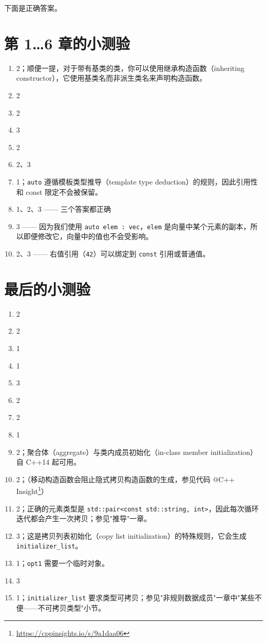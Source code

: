 下面是正确答案。

\section{第 1…6 章的小测验}

\begin{enumerate}
\item 2；顺便一提，对于带有基类的类，你可以使用继承构造函数（inheriting constructor），它使用基类名而非派生类名来声明构造函数。
\item 2
\item 2
\item 3
\item 2
\item 2、3
\item 1；\texttt{auto} 遵循模板类型推导（template type deduction）的规则，因此引用性和 const 限定不会被保留。
\item 1、2、3 —— 三个答案都正确
\item 3 —— 因为我们使用 \texttt{auto elem : vec}，\texttt{elem} 是向量中某个元素的副本，所以即便修改它，向量中的值也不会受影响。
\item 2、3 —— 右值引用（\texttt{42}）可以绑定到 \texttt{const} 引用或普通值。
\end{enumerate}

\section{最后的小测验}

\begin{enumerate}
\item 2
\item 2
\item 1
\item 1
\item 3
\item 2
\item 2
\item 1
\item 2；聚合体（aggregate）与类内成员初始化（in-class member initialization）自 C++14 起可用。
\item 2；（移动构造函数会阻止隐式拷贝构造函数的生成，参见代码 @C++ Insight\footnote{\url{https://cppinsights.io/s/9a1daa06}}）
\item 2；正确的元素类型是 \texttt{std::pair<const std::string, int>}，因此每次循环迭代都会产生一次拷贝；参见"推导"一章。
\item 3；这是拷贝列表初始化（copy list initialization）的特殊规则，它会生成 \texttt{initializer\_list}。
\item 1；\texttt{opt1} 需要一个临时对象。
\item 3
\item 1；\texttt{initializer\_list} 要求类型可拷贝；参见"非规则数据成员"一章中"某些不便——不可拷贝类型"小节。
\end{enumerate}

